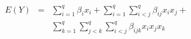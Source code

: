

\[
\begin{array}{lll} E(Y) & = & \sum_{i=1}^{q}{\beta_{i}x_{i}} + \sum_{i=1}^{q}{\sum_{i < j}^{q}{\beta_{ij}x_{i}x_{j}}} + \\ & & \sum_{k=1}^{q}{\sum_{j < k}^{q}{\sum_{i < j}^{q}{\beta_{ijk}x_{i}x_{j}x_{k}}}} \end{array}
\]


